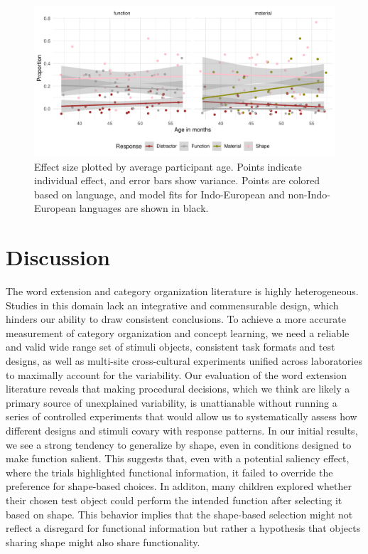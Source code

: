 \documentclass[10pt, letterpaper]{article}
\newenvironment{CodeChunk}{}{}
\begin{document}
\begin{CodeChunk}
\begin{figure}[tb]
\includegraphics[width=1\linewidth]{figs/jitter_function-1} \caption[Effect size plotted by average participant age]{Effect size plotted by average participant age. Points indicate individual effect, and error bars show variance. Points are colored based on language, and model fits for Indo-European and non-Indo-European languages are shown in black.}\label{fig:jitter_function}
\end{figure}
\end{CodeChunk}

\hypertarget{discussion}{%
\section{Discussion}\label{discussion}}

The word extension and category organization literature is highly
heterogeneous. Studies in this domain lack an integrative and
commensurable design, which hinders our ability to draw consistent
conclusions. To achieve a more accurate measurement of category
organization and concept learning, we need a reliable and valid wide
range set of stimuli objects, consistent task formats and test designs,
as well as multi-site cross-cultural experiments unified across
laboratories to maximally account for the variability. Our evaluation of
the word extension literature reveals that making procedural decisions,
which we think are likely a primary source of unexplained variability,
is unattianable without running a series of controlled experiments that
would allow us to systematically assess how different designs and
stimuli covary with response patterns. In our initial results, we see a
strong tendency to generalize by shape, even in conditions designed to
make function salient. This suggests that, even with a potential
saliency effect, where the trials highlighted functional information, it
failed to override the preference for shape-based choices. In additon,
many children explored whether their chosen test object could perform
the intended function after selecting it based on shape. This behavior
implies that the shape-based selection might not reflect a disregard for
functional information but rather a hypothesis that objects sharing
shape might also share functionality.
\end{document}
